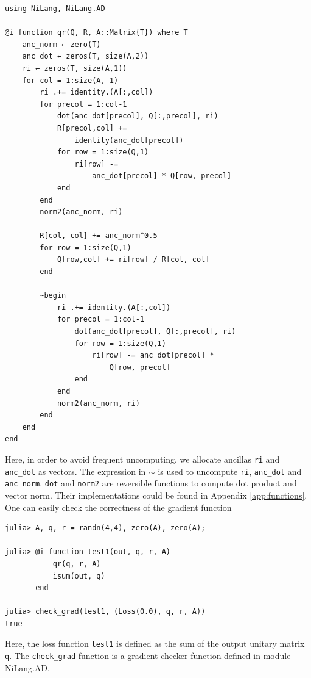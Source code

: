 \documentclass[aps,twocolumn,longbibliography,english,superscriptaddress]{revtex4-1}
\newcommand{\<}{\langle}
\renewcommand{\>}{\rangle}
\newcommand{\App}[1]{Appendix \ref{#1}}
\theoremstyle{definition}\newtheorem{definition}{\textit{Definition}}
\begin{document}
\begin{minipage}{.44\textwidth}
\begin{lstlisting}
using NiLang, NiLang.AD

@i function qr(Q, R, A::Matrix{T}) where T
    anc_norm ← zero(T)
    anc_dot ← zeros(T, size(A,2))
    ri ← zeros(T, size(A,1))
    for col = 1:size(A, 1)
        ri .+= identity.(A[:,col])
        for precol = 1:col-1
            dot(anc_dot[precol], Q[:,precol], ri)
            R[precol,col] += 
                identity(anc_dot[precol])
            for row = 1:size(Q,1)
                ri[row] -= 
                    anc_dot[precol] * Q[row, precol]
            end
        end
        norm2(anc_norm, ri)

        R[col, col] += anc_norm^0.5
        for row = 1:size(Q,1)
            Q[row,col] += ri[row] / R[col, col]
        end

        ~begin
            ri .+= identity.(A[:,col])
            for precol = 1:col-1
                dot(anc_dot[precol], Q[:,precol], ri)
                for row = 1:size(Q,1)
                    ri[row] -= anc_dot[precol] *
                        Q[row, precol]
                end
            end
            norm2(anc_norm, ri)
        end
    end
end
\end{lstlisting}
\end{minipage}

Here, in order to avoid frequent uncomputing, we allocate ancillas \texttt{ri} and \texttt{anc\_dot} as vectors.
The expression in $\sim$ is used to uncompute \texttt{ri}, \texttt{anc\_dot} and \texttt{anc\_norm}.
\texttt{dot} and \texttt{norm2} are reversible functions to compute dot product and vector norm.
Their implementations could be found in \App{app:functions}.
One can easily check the correctness of the gradient function

\begin{minipage}{.44\textwidth}
\begin{lstlisting}
julia> A, q, r = randn(4,4), zero(A), zero(A);

julia> @i function test1(out, q, r, A)
           qr(q, r, A)
           isum(out, q)
       end

julia> check_grad(test1, (Loss(0.0), q, r, A))
true
\end{lstlisting}
\end{minipage}

Here, the loss function \texttt{test1} is defined as the sum of the output unitary matrix \texttt{q}. The \texttt{check\_grad} function is a gradient checker function defined in module NiLang.AD.
\end{document}
